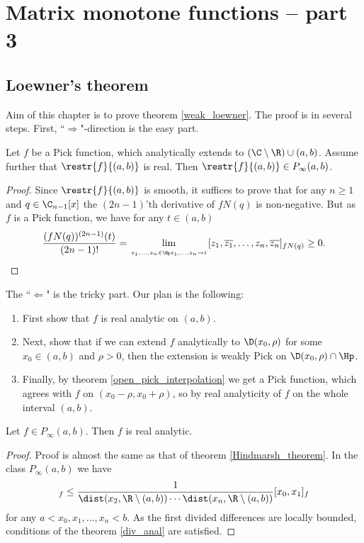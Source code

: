 \chapter{Matrix monotone functions -- part 3}

\section{Loewner's theorem}

Aim of this chapter is to prove theorem \ref{weak_loewner}. The proof is in several steps. First, ``$\Rightarrow$"-direction is the easy part.

\begin{lem}\label{weak_loewner_converse}
	Let $f$ be a Pick function, which analytically extends to $(\C \setminus \R) \cup (a, b)$. Assume further that $\restr{f}{(a, b)}$ is real. Then $\restr{f}{(a, b)} \in P_{\infty}(a, b)$.
\end{lem}
\begin{proof}
	Since $\restr{f}{(a, b)}$ is smooth, it suffices to prove that for any $n \geq 1$ and $q \in \C_{n - 1}[x]$ the $(2n - 1)$'th derivative of $f N(q)$ is non-negative. But as $f$ is a Pick function, we have for any $t \in (a, b)$
	\begin{align*}
		\frac{(f N(q))^{(2 n - 1)}(t)}{(2 n - 1)!} = \lim_{\atop{z_{1}, \ldots, z_{n} \in \Hp}{z_{1}, \ldots, z_{n} \to t}} [z_{1}, \overline{z_{1}}, \ldots, z_{n}, \overline{z_{n}}]_{f N(q)} \geq 0.
	\end{align*}
\end{proof}

The ``$\Leftarrow$" is the tricky part. Our plan is the following:
\begin{enumerate}
	\item First show that $f$ is real analytic on $(a, b)$.
	\item Next, show that if we can extend $f$ analytically to $\D(x_{0}, \rho)$ for some $x_{0} \in (a, b)$ and $\rho > 0$, then the extension is weakly Pick on $\D(x_{0}, \rho) \cap \Hp$.
	\item Finally, by theorem \ref{open_pick_interpolation} we get a Pick function, which agrees with $f$ on $(x_{0} - \rho, x_{0} + \rho)$, so by real analyticity of $f$ on the whole interval $(a, b)$.
\end{enumerate}

\begin{lem}\label{loewner_analytic}
	Let $f \in P_{\infty}(a, b)$. Then $f$ is real analytic.
\end{lem}
\begin{proof}
	Proof is almost the same as that of theorem \ref{Hindmarsh_theorem}. In the class $P_{\infty}(a, b)$ we have
	\begin{align*}
		[x_{0}, x_{1}, \ldots, x_{n}]_{f} \leq \frac{1}{\dist(x_{2}, \R \setminus (a, b)) \cdots \dist(x_{n}, \R \setminus (a, b))} [x_{0}, x_{1}]_{f}
	\end{align*}
	for any $a < x_{0}, x_{1}, \ldots, x_{n} < b$. As the first divided differences are locally bounded, conditions of the theorem \ref{div_anal} are satisfied.
\end{proof}

